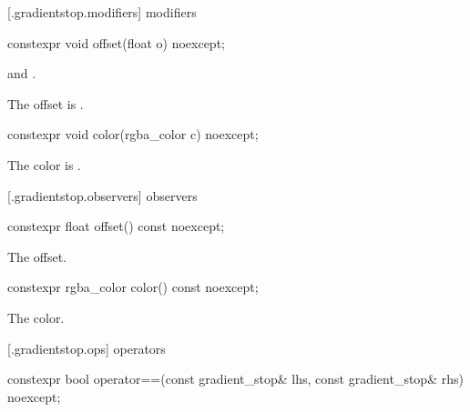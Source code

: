  [\iotwod.gradientstop.modifiers] { modifiers}

%
\begin{itemdecl}
constexpr void offset(float o) noexcept;
\end{itemdecl}
\begin{itemdescr}
\pnum
\requires
{} and .

\pnum
\effects
The offset is .
\end{itemdescr}

%
\begin{itemdecl}
constexpr void color(rgba_color c) noexcept;
\end{itemdecl}
\begin{itemdescr}
\pnum
\effects
The color is .
\end{itemdescr}

 [\iotwod.gradientstop.observers] { observers}

%
\begin{itemdecl}
constexpr float offset() const noexcept;
\end{itemdecl}
\begin{itemdescr}
\pnum
\returns
The offset.
\end{itemdescr}

%
\begin{itemdecl}
constexpr rgba_color color() const noexcept;
\end{itemdecl}
\begin{itemdescr}
\pnum
\returns
The color.
\end{itemdescr}

 [\iotwod.gradientstop.ops] { operators}

%
\begin{itemdecl}
constexpr bool operator==(const gradient_stop& lhs, const gradient_stop& rhs)
  noexcept;
\end{itemdecl}
\begin{itemdescr}
\pnum
\returns
{}
\end{itemdescr}
